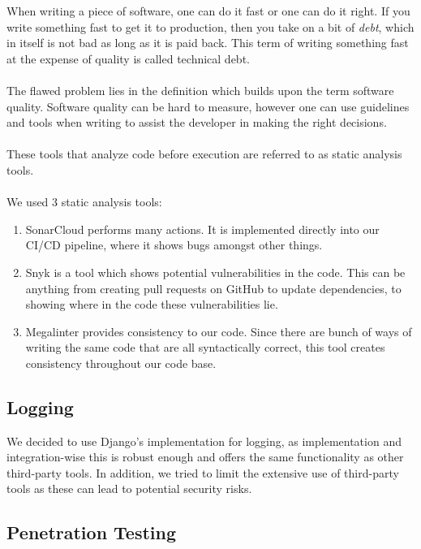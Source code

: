 When writing a piece of software, one can do it fast or one can do it right. If you write something fast to get it to production, then you take on a bit of \textit{debt}, which in itself is not bad as long as it is paid back. This term of writing something fast at the expense of quality is called technical debt.
\\\\
The flawed problem lies in the definition which builds upon the term software quality. Software quality can be hard to measure, however one can use guidelines and tools when writing to assist the developer in making the right decisions.
\\\\
These tools that analyze code before execution are referred to as static analysis tools.
\\\\
We used 3 static analysis tools:
\begin{enumerate}
    \item SonarCloud performs many actions. It is implemented directly into our CI/CD pipeline, where it shows bugs amongst other things.
    \item Snyk is a tool which shows potential vulnerabilities in the code. This can be anything from creating pull requests on GitHub to update dependencies, to showing where in the code these vulnerabilities lie.
    \item Megalinter provides consistency to our code. Since there are bunch of ways of writing the same code that are all syntactically correct, this tool creates consistency throughout our code base.
\end{enumerate}

\subsection*{Logging}

We decided to use Django's implementation for logging, as implementation and integration-wise this is robust enough and offers the same functionality as other third-party tools. In addition, we tried to limit the extensive use of third-party tools as these can lead to potential security risks.

\subsection*{Penetration Testing}

